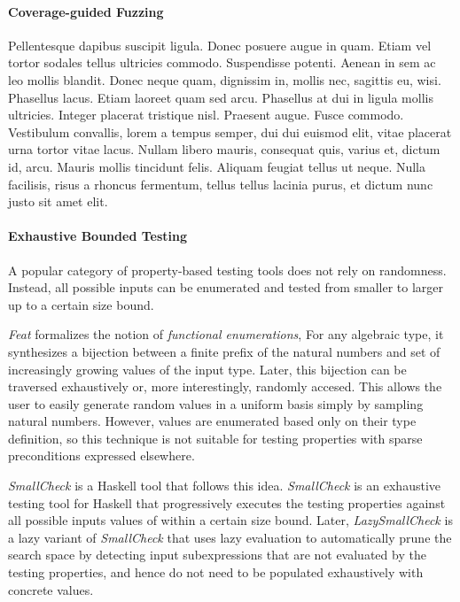 \documentclass[acmsmall, anonymous]{acmart}
\begin{document}
\paragraph{Coverage-guided Fuzzing}







Pellentesque dapibus suscipit ligula. Donec posuere augue in quam. Etiam vel
tortor sodales tellus ultricies commodo. Suspendisse potenti. Aenean in sem ac
leo mollis blandit. Donec neque quam, dignissim in, mollis nec, sagittis eu,
wisi. Phasellus lacus. Etiam laoreet quam sed arcu. Phasellus at dui in ligula
mollis ultricies. Integer placerat tristique nisl. Praesent augue. Fusce
commodo. Vestibulum convallis, lorem a tempus semper, dui dui euismod elit,
vitae placerat urna tortor vitae lacus. Nullam libero mauris, consequat quis,
varius et, dictum id, arcu. Mauris mollis tincidunt felis. Aliquam feugiat
tellus ut neque. Nulla facilisis, risus a rhoncus fermentum, tellus tellus
lacinia purus, et dictum nunc justo sit amet elit.


\paragraph{Exhaustive Bounded Testing}

A popular category of property-based testing tools does not rely on randomness.
%
Instead, all possible inputs can be enumerated and tested from smaller to larger
up to a certain size bound.

%
%
\emph{Feat} \cite{feat} formalizes the notion of \emph{functional enumerations},
For any algebraic type, it synthesizes a bijection between a finite prefix of
the natural numbers and set of increasingly growing values of the input type.
%
Later, this bijection can be traversed exhaustively or, more interestingly,
randomly accesed.
%
This allows the user to easily generate random values in a uniform basis simply
by sampling natural numbers.
%
However, values are enumerated based only on their type definition, so this
technique is not suitable for testing properties with sparse preconditions
expressed elsewhere.


\emph{SmallCheck} \cite{smallcheck} is a Haskell tool that follows this idea.
%
\emph{SmallCheck} is an exhaustive testing tool for Haskell that progressively
executes the testing properties against all possible inputs values of within
a certain size bound.
%
Later, \emph{LazySmallCheck} is a lazy variant of \emph{SmallCheck} that uses
lazy evaluation to automatically prune the search space by detecting input
subexpressions that are not evaluated by the testing properties, and hence do
not need to be populated exhaustively with concrete values.
\end{document}
